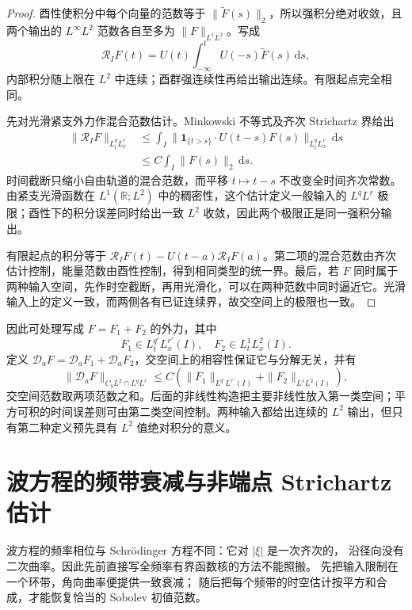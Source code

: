 \begin{proof}
酉性使积分中每个向量的范数等于 \(\|\widetilde F(s)\|_2\)，所以强积分绝对收敛，且两个输出的 \(L^\infty L^2\) 范数各自至多为 \(\|F\|_{L^1L^2}\)。写成
\[
 \mathcal R_I F(t)
 =U(t)\int_{-\infty}^tU(-s)\widetilde F(s)\,\mathrm ds,
\]
内部积分随上限在 \(L^2\) 中连续；酉群强连续性再给出输出连续。有限起点完全相同。

先对光滑紧支外力作混合范数估计。Minkowski 不等式及齐次 Strichartz 界给出
\[
 \begin{aligned}
 \|\mathcal R_I F\|_{L^q_tL^r_x}
 &\leq\int_I
       \|\mathbf1_{\{t>s\}}\cdot U(t-s)F(s)
                              \|_{L^q_tL^r_x}\,\mathrm ds\\
 &\leq C\int_I\|F(s)\|_2\,\mathrm ds.
 \end{aligned}
\]
时间截断只缩小自由轨道的混合范数，而平移 \(t\mapsto t-s\) 不改变全时间齐次常数。由紧支光滑函数在 \(L^1(\mathbb R;L^2)\) 中的稠密性，这个估计定义一般输入的 \(L^qL^r\) 极限；酉性下的积分误差同时给出一致 \(L^2\) 收敛，因此两个极限正是同一强积分输出。

有限起点的积分等于
\(\mathcal R_I F(t)-U(t-a)\mathcal R_I F(a)\)。第二项的混合范数由齐次估计控制，能量范数由酉性控制，得到相同类型的统一界。最后，若 \(F\) 同时属于两种输入空间，先作时空截断，再用光滑化，可以在两种范数中同时逼近它。光滑输入上的定义一致，而两侧各有已证连续界，故交空间上的极限也一致。
\end{proof}
因此可处理写成 \(F=F_1+F_2\) 的外力，其中
\[
 F_1\in L^{q'}_tL^{r'}_x(I),\quad
 F_2\in L^1_tL^2_x(I).
\]
定义 \(\mathcal D_aF=\mathcal D_aF_1+\mathcal D_aF_2\)，交空间上的相容性保证它与分解无关，并有
\[
 \|\mathcal D_aF\|_{C_bL^2\cap L^qL^r}
 \leq C\left(\|F_1\|_{L^{q'}L^{r'}(I)}
                  +\|F_2\|_{L^1L^2(I)}\right),
\]
交空间范数取两项范数之和。后面的非线性构造把主要非线性放入第一类空间；平方可积的时间误差则可由第二类空间控制。两种输入都给出连续的 \(L^2\) 输出，但只有第二种定义预先具有 \(L^2\) 值绝对积分的意义。

\section{波方程的频带衰减与非端点 Strichartz 估计}

\label{b2:sec:app-E-3}

波方程的频率相位与 Schrödinger 方程不同：它对 \(|\xi|\) 是一次齐次的，
沿径向没有二次曲率。因此先前直接写全频率有界函数核的方法不能照搬。
先把输入限制在一个环带，角向曲率便提供一致衰减；
随后把每个频带的时空估计按平方和合成，才能恢复恰当的 Sobolev 初值范数。

